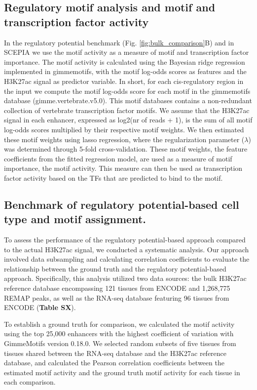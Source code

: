 \subsection{Regulatory motif analysis and motif and transcription factor activity}

In the regulatory potential benchmark (Fig. \ref{fig:bulk_comparison}B) and in SCEPIA we use the motif activity as a measure of motif and transcription factor importance. The motif activity\cite{FANTOM2009, Balwierz2014} is calculated using the Bayesian ridge regression implemented in gimmemotifs\cite{Bruse_2018}, with the motif log-odds scores as features and the H3K27ac signal as predictor variable. In short, for each cis-regulatory region in the input we compute the motif log-odds score for each motif in the gimmemotifs database (gimme.vertebrate.v5.0). This motif databases contains a non-redundant collection of vertebrate transcription factor motifs\cite{Bruse_2018}. We assume that the H3K27ac signal in each enhancer, expressed as log2(nr of reads + 1), is the sum of all motif log-odds scores multiplied by their respective motif weights. We then estimated these motif weights using lasso regression, where the regularization parameter ($\lambda$) was determined through 5-fold cross-validation. These motif weights, the feature coefficients from the fitted regression model, are used as a measure of motif importance, the motif activity. This measure can then be used as transcription factor activity based on the TFs that are predicted to bind to the motif.

\subsection{Benchmark of regulatory potential-based cell type and motif assignment.}

To assess the performance of the regulatory potential-based approach compared to the actual H3K27ac signal, we conducted a systematic analysis. Our approach involved data subsampling and calculating correlation coefficients to evaluate the relationship between the ground truth and the regulatory potential-based approach. Specifically, this analysis utilized two data sources: the bulk H3K27ac reference database encompassing 121 tissues from ENCODE and 1,268,775 REMAP peaks, as well as the RNA-seq database featuring 96 tissues from ENCODE (\textbf{Table SX}).

To establish a ground truth for comparison, we calculated the motif activity using the top 25,000 enhancers with the highest coefficient of variation with GimmeMotifs version 0.18.0\cite{Bruse_2018}. We selected random subsets of five tissues from tissues shared between the RNA-seq database and the H3K27ac reference database, and calculated the Pearson correlation coefficients between the estimated motif activity and the ground truth motif activity for each tissue in each comparison.

